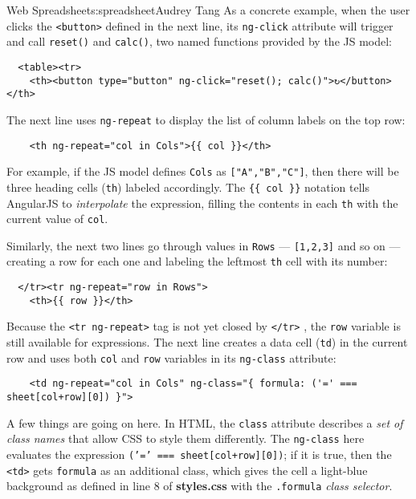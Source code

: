 \begin{aosachapter}{Web Spreadsheet}{s:spreadsheet}{Audrey Tang}
As a concrete example, when the user clicks the
\texttt{\textless{}button\textgreater{}} defined in the next line, its
\texttt{ng-click} attribute will trigger and call \texttt{reset()} and
\texttt{calc()}, two named functions provided by the JS model:

\begin{verbatim}
  <table><tr>
    <th><button type="button" ng-click="reset(); calc()">↻</button></th>
\end{verbatim}

The next line uses \texttt{ng-repeat} to display the list of column
labels on the top row:

\begin{verbatim}
    <th ng-repeat="col in Cols">{{ col }}</th>
\end{verbatim}

For example, if the JS model defines \texttt{Cols} as
\texttt{{[}"A","B","C"{]}}, then there will be three heading cells
(\texttt{th}) labeled accordingly. The \texttt{\{\{ col \}\}} notation
tells AngularJS to \emph{interpolate} the expression, filling the
contents in each \texttt{th} with the current value of \texttt{col}.

Similarly, the next two lines go through values in \texttt{Rows} ---
\texttt{{[}1,2,3{]}} and so on --- creating a row for each one and
labeling the leftmost \texttt{th} cell with its number:

\begin{verbatim}
  </tr><tr ng-repeat="row in Rows">
    <th>{{ row }}</th>
\end{verbatim}

Because the \texttt{\textless{}tr ng-repeat\textgreater{}} tag is not
yet closed by \texttt{\textless{}/tr\textgreater{}} , the \texttt{row}
variable is still available for expressions. The next line creates a
data cell (\texttt{td}) in the current row and uses both \texttt{col}
and \texttt{row} variables in its \texttt{ng-class} attribute:

\begin{verbatim}
    <td ng-repeat="col in Cols" ng-class="{ formula: ('=' === sheet[col+row][0]) }">
\end{verbatim}

A few things are going on here. In HTML, the \texttt{class} attribute
describes a \emph{set of class names} that allow CSS to style them
differently. The \texttt{ng-class} here evaluates the expression
\texttt{('=' === sheet{[}col+row{]}{[}0{]})}; if it is true, then the
\texttt{\textless{}td\textgreater{}} gets \texttt{formula} as an
additional class, which gives the cell a light-blue background as
defined in line 8 of \textbf{styles.css} with the \texttt{.formula}
\emph{class selector}.


\end{aosachapter}
